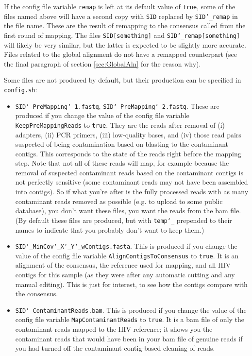 \documentclass{article}
\let\c\texttt
\begin{document}
If the config file variable \c{remap} is left at its default value of \c{true}, some of the files named above will have a second copy with \c{SID} replaced by \c{SID\char`_remap} in the file name.
These are the result of remapping to the consensus called from the first round of mapping.
The files \c{SID[something]} and \c{SID\char`_remap[something]} will likely be very similar, but the latter is expected to be slightly more accurate.
Files related to the global alignment do not have a remapped counterpart (see the final paragraph of section \ref{sec:GlobalAln} for the reason why).

Some files are not produced by default, but their production can be specified in \c{config.sh}:
\begin{itemize}
\item \c{SID\char`_PreMapping\char`_1.fastq}, \c{SID\char`_PreMapping\char`_2.fastq}.
These are produced if you change the value of the config file variable \c{KeepPreMappingReads} to \c{true}.
They are the reads after removal of (i) adapters, (ii) PCR primers, (iii) low-quality bases, and (iv) those read pairs suspected of being contamination based on blasting to the contaminant contigs.
This corresponds to the state of the reads right before the mapping step.
Note that not all of these reads will map, for example because the removal of suspected contaminant reads based on the contaminant contigs is not perfectly sensitive (some contaminant reads may not have been assembled into contigs).
So if what you're after is the fully processed reads with as many contaminant reads removed as possible (e.g. to upload to some public database), you don't want these files, you want the reads from the bam file.
(By default these files are produced, but with \c{temp\char`_} prepended to their names to indicate that you probably don't want to keep them.)
\item \c{SID\char`_MinCov\char`_X\char`_Y\char`_wContigs.fasta}.
This is produced if you change the value of the config file variable \c{AlignContigsToConsensus} to \c{true}.
It is an alignment of the consensus, the reference used for mapping, and all HIV contigs for this sample (as they were after any automatic cutting and any manual editing).
This is just for interest, to see how the contigs compare with the consensus.
\item \c{SID\char`_ContaminantReads.bam}.
This is produced if you change the value of the config file variable \c{MapContaminantReads} to \c{true}.
It is a bam file of only the contaminant reads mapped to the HIV reference; it shows you the contaminant reads that would have been in your bam file of genuine reads if you had turned off the contaminant-contig-based cleaning of reads.
\end{itemize}
\end{document}
